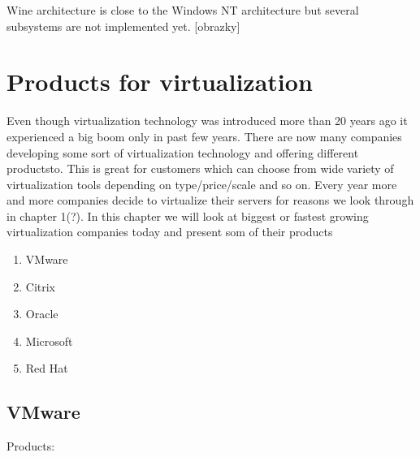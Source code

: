 \begin{enumerate}
Wine architecture is close to the Windows NT architecture but several subsystems are not implemented yet.
[obrazky]


\chapter{Products for virtualization}

Even though virtualization technology was introduced more than 20 years ago it experienced a big boom only in past few years. There are now many companies developing some sort of virtualization technology and offering different productsto. This is great for customers which can choose from wide variety of virtualization tools depending on type/price/scale and so on. Every year more and more companies decide to virtualize their servers for reasons we look through in chapter 1(?). In this chapter we will look at biggest or fastest growing virtualization companies today and present som of their products

\begin{enumerate}
\item VMware
\item Citrix
\item Oracle
\item Microsoft
\item Red Hat
\end{enumerate}

\section{VMware}

Products:

\end{enumerate}
